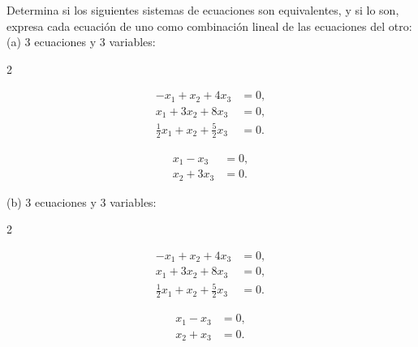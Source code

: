 \documentclass[12pt,a4paper]{book}
\begin{document}
    \begin{ejercicio}
        Determina si los siguientes sistemas de ecuaciones son equivalentes, y si lo son, expresa cada ecuación de uno como combinación lineal de las ecuaciones del otro:\\
        (a) 3 ecuaciones y 3 variables:
        \vspace{-1.5\baselineskip}
        \begin{multicols}{2}
            \begin{minipage}[t]{\linewidth}
                \begin{align}
                    -x_1 + x_2 + 4x_3 &= 0, \\
                    x_1 + 3x_2 + 8x_3 &= 0, \\
                    \frac12 x_1 + x_2 + \frac 52 x_3 &= 0.
                \end{align}
            \end{minipage}
            
            \columnbreak
            
            \begin{minipage}[t]{\linewidth}
                \begin{align*}
                    x_1 - x_3 &= 0, \\
                    x_2 + 3x_3 &= 0. 
                \end{align*}
            \end{minipage}
        \end{multicols}
        (b) 3 ecuaciones y 3 variables:
        \vspace{-1.5\baselineskip}
        \begin{multicols}{2}
            \begin{minipage}[t]{\linewidth}
                \begin{align*}
                    -x_1 + x_2 + 4x_3 &= 0, \\
                    x_1 + 3x_2 + 8x_3 &= 0,  \\
                    \frac12 x_1 + x_2 + \frac52 x_3 &= 0. 
                \end{align*}
            \end{minipage}
            
            \columnbreak
            
            \begin{minipage}[t]{\linewidth}
                \begin{align*}
                    x_1 - x_3 & = 0, \\
                    x_2 + x_3 & = 0. 
                \end{align*}
                
            \end{minipage}
        \end{multicols}
    \end{ejercicio}
\end{document}
